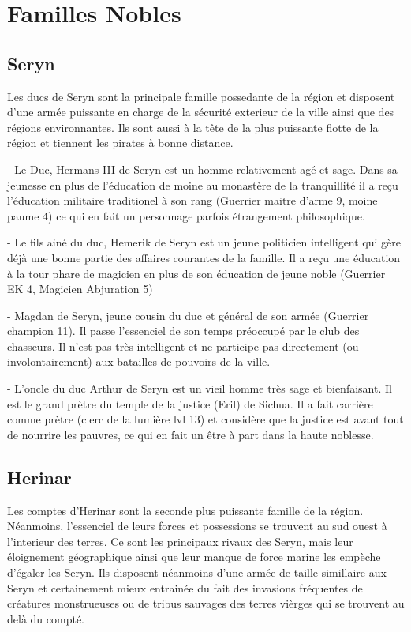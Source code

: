 \section{Familles Nobles}

\subsection*{Seryn}

Les ducs de Seryn sont la principale famille possedante de la région et disposent
d'une armée puissante en charge de la sécurité exterieur de la ville ainsi que
des régions environnantes. Ils sont aussi à la tête de la plus puissante flotte de 
la région et tiennent les pirates à bonne distance.

- Le Duc, Hermans III de Seryn est un homme relativement agé et sage. Dans sa
  jeunesse en plus de l'éducation de moine au monastère de la tranquillité
  il a reçu l'éducation militaire traditionel à son rang 
  (Guerrier maitre d'arme 9, moine paume 4)
  ce qui en fait un personnage parfois étrangement philosophique.

- Le fils ainé du duc, Hemerik de Seryn est un jeune politicien intelligent 
  qui gère déjà une bonne partie des affaires courantes de la famille. Il
  a reçu une éducation à la tour phare de magicien en plus de son éducation
  de jeune noble (Guerrier EK 4, Magicien Abjuration 5)

- Magdan de Seryn, jeune cousin du duc et général de son armée 
  (Guerrier champion 11). Il passe
  l'essenciel de son temps préoccupé par le club des chasseurs. Il n'est
  pas très intelligent et ne participe pas directement (ou involontairement)
  aux batailles de pouvoirs de la ville.

- L'oncle du duc Arthur de Seryn est un vieil homme très sage et bienfaisant.
  Il est le grand prètre du temple de la justice (Eril) de Sichua. Il a fait
  carrière comme prètre (clerc de la lumière lvl 13) et considère que la 
  justice est avant tout de nourrire les pauvres, ce qui en fait un être à
  part dans la haute noblesse.

\subsection*{Herinar}

Les comptes d'Herinar sont la seconde plus puissante famille de la région. Néanmoins,
l'essenciel de leurs forces et possessions se trouvent au sud ouest à l'interieur
des terres. Ce sont les principaux rivaux des Seryn, mais leur éloignement
géographique ainsi que leur manque de force marine les empèche d'égaler les Seryn.
Ils disposent néanmoins d'une armée de taille simillaire aux Seryn et certainement 
mieux entrainée du fait des invasions fréquentes de créatures monstrueuses ou de
tribus sauvages des terres vièrges qui se trouvent au delà du compté. 

